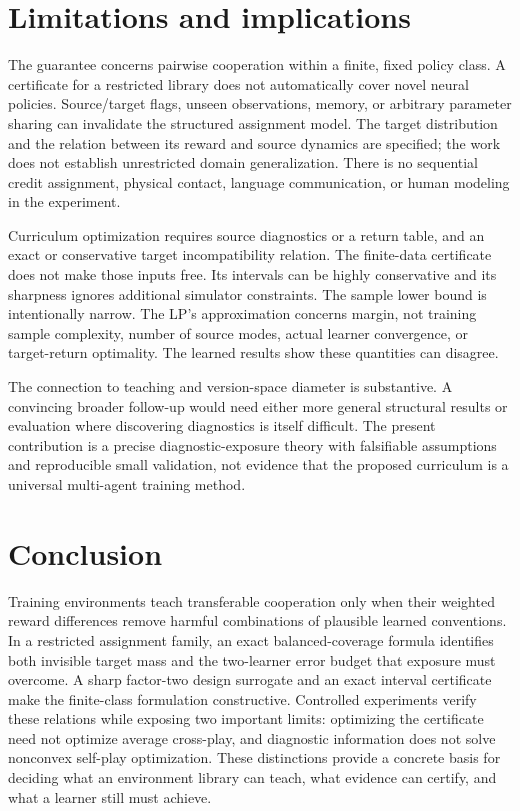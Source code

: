 \documentclass[11pt]{article}
\theoremstyle{definition}\newtheorem{definition}[theorem]{Definition}
\newcommand{\1}{\mathbf{1}}
\begin{document}
\section{Limitations and implications}
The guarantee concerns pairwise cooperation within a finite, fixed policy class. A certificate for a restricted library does not automatically cover novel neural policies. Source/target flags, unseen observations, memory, or arbitrary parameter sharing can invalidate the structured assignment model. The target distribution and the relation between its reward and source dynamics are specified; the work does not establish unrestricted domain generalization. There is no sequential credit assignment, physical contact, language communication, or human modeling in the experiment.

Curriculum optimization requires source diagnostics or a return table, and an exact or conservative target incompatibility relation. The finite-data certificate does not make those inputs free. Its intervals can be highly conservative and its sharpness ignores additional simulator constraints. The sample lower bound is intentionally narrow. The LP's approximation concerns margin, not training sample complexity, number of source modes, actual learner convergence, or target-return optimality. The learned results show these quantities can disagree.

The connection to teaching and version-space diameter is substantive. A convincing broader follow-up would need either more general structural results or evaluation where discovering diagnostics is itself difficult. The present contribution is a precise diagnostic-exposure theory with falsifiable assumptions and reproducible small validation, not evidence that the proposed curriculum is a universal multi-agent training method.

\section{Conclusion}
Training environments teach transferable cooperation only when their weighted reward differences remove harmful combinations of plausible learned conventions. In a restricted assignment family, an exact balanced-coverage formula identifies both invisible target mass and the two-learner error budget that exposure must overcome. A sharp factor-two design surrogate and an exact interval certificate make the finite-class formulation constructive. Controlled experiments verify these relations while exposing two important limits: optimizing the certificate need not optimize average cross-play, and diagnostic information does not solve nonconvex self-play optimization. These distinctions provide a concrete basis for deciding what an environment library can teach, what evidence can certify, and what a learner still must achieve.
\end{document}
